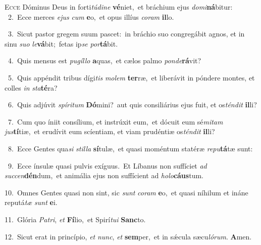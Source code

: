 \lettrine{\initial\textcolor{\initialcolor}{E}}{cce} Dóminus Deus in forti\-\textit{tú}\-\textit{di}\textit{ne} \textbf{vé}\-niet,~\star et bráchium ejus \textit{do}\-\textit{mi}\textbf{ná}bitur:\\
{\numbfont\textcolor{\numbcolor}{~2.}}~Ecce merces \textit{e}\-\textit{jus} \textit{cum} \textbf{e}\-o,~\star et opus illíus \textit{co}\-\textit{ram} \textbf{il}\-lo.\par
{\numbfont\textcolor{\numbcolor}{~3.}}~Sicut pastor gregem suum pascet:~\dagger in bráchio suo congregábit agnos, et in sinu \textit{su}\-\textit{o} \textit{le}\-\textbf{vá}bit;~\star fetas ip\textit{se} \textit{por}\-\textbf{tá}bit.\par
{\numbfont\textcolor{\numbcolor}{~4.}}~Quis mensus est \textit{pu}\-\textit{gíl}\textit{lo} \textbf{a}\-quas,~\star et cælos palmo \textit{pon}\-\textit{de}\textbf{rá}vit?\par
{\numbfont\textcolor{\numbcolor}{~5.}}~Quis appéndit tribus dígi\textit{tis} \textit{mo}\-\textit{lem} \textbf{ter}\-ræ,~\star et liberávit in póndere montes, et colles \textit{in} \textit{sta}\-\textbf{té}ra?\par
{\numbfont\textcolor{\numbcolor}{~6.}}~Quis adjúvit \textit{spí}\-\textit{ri}\textit{tum} \textbf{Dó}\-mini?~\star aut quis consiliárius ejus fuit, et os\-\textit{tén}\-\textit{dit} \textbf{il}\-li?\par
{\numbfont\textcolor{\numbcolor}{~7.}}~Cum quo íniit consílium, et instrúxit eum,~\dagger et dócuit eum sé\-\textit{mi}\-\textit{tam} \textit{jus}\-\textbf{tí}tiæ,~\star et erudívit eum scíentiam, et viam prudéntiæ os\-\textit{tén}\-\textit{dit} \textbf{il}\-li?\par
{\numbfont\textcolor{\numbcolor}{~8.}}~Ecce Gentes qua\textit{si} \textit{stil}\-\textit{la} \textbf{sí}\-tulæ,~\star et quasi moméntum statéræ \textit{re}\-\textit{pu}\textbf{tá}tæ sunt:\par
{\numbfont\textcolor{\numbcolor}{~9.}}~Ecce ínsulæ quasi pulvis exíguus.~\dagger Et Líbanus non suffíciet \textit{ad} \textit{suc}\-\textit{cen}\textbf{dén}dum,~\star et animália ejus non suffícient ad \textit{ho}\-\textit{lo}\textbf{cáus}tum.\par
{\numbfont\textcolor{\numbcolor}{10.}}~Omnes Gentes quasi non sint, sic \textit{sunt} \textit{co}\-\textit{ram} \textbf{e}\-o,~\star et quasi níhilum et ináne reputá\textit{tæ} \textit{sunt} \textbf{e}\-i.\par
{\numbfont\textcolor{\numbcolor}{11.}}~Glória \textit{Pa}\-\textit{tri}, \textit{et} \textbf{Fí}\-lio,~\star et Spirí\-\textit{tu}\-\textit{i} \textbf{Sanc}\-to.\par
{\numbfont\textcolor{\numbcolor}{12.}}~Sicut erat in princípio, \textit{et} \textit{nunc}\-, \textit{et} \textbf{sem}\-per,~\star et in sǽcula sæcu\-\textit{ló}\-\textit{rum}. \textbf{A}\-men.\par
